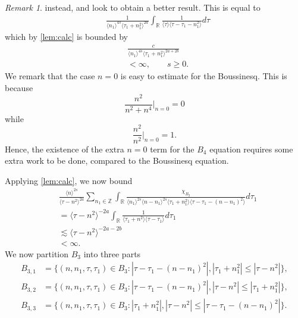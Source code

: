 \documentclass[12pt,reqno]{amsart}
\numberwithin{equation}{section}  %
\numberwithin{figure}{section}
\newcommand{\rr}{\mathbb{R}}
\newcommand{\zz}{\mathbb{Z}}
\theoremstyle{plain}
\theoremstyle{definition}
\theoremstyle{remark}
\newtheorem{remark}{Remark}
\begin{document}
\begin{framed}
\begin{remark}
instead, and look to obtain a better result. This is equal to 
%
\begin{equation*}
\begin{split}
  & \frac{1}{\langle n_{1} \rangle ^{4s}
  \langle \tau_{1} + n_{1}^{2} \rangle
  ^{2a}} \int_{\rr} \frac{1}{\langle
  \tau  \rangle  \langle \tau - \tau_{1} - n_{1}^{2}
  \rangle } d \tau
\end{split}
\end{equation*}
%
%
which by \autoref{lem:calc} is bounded by
%
%
\begin{equation*}
\begin{split}
  & \frac{c}{\langle n_{1} \rangle ^{4s}
  \langle \tau_{1} + n_{1}^{2} \rangle
  ^{2a + 2b}}
\\
& < \infty, \qquad s \ge 0. 
\end{split}
\end{equation*}
%
%
We remark that the case $n=0$ is easy to estimate for the Boussinesq. This is
because  $$\frac{n^{2}}{n^{2} + n^{4}} |_{n=0} = 0$$ while
$$\frac{n^{2}}{n^{2}} |_{n=0} = 1.$$ 
Hence, the existence of the extra $n = 0$ term 
for the $B_{4}$ equation requires some extra work to be done, compared to the
Boussinesq equation. 
\end{remark}
\end{framed}
Applying \autoref{lem:calc}, we now bound 
\begin{equation*}
  \begin{split}
    & \frac{ \langle n
    \rangle ^{2s}}{\langle \tau - n^{2} \rangle ^{2a}}
    \sum_{n_{1} \in \zz} \int_{\rr} \frac{\chi_{B_{2}}}{ \langle n_{1} \rangle ^{2s} \langle n-n_{1} \rangle ^{2s} 
    \langle \tau_{1} + n_{1}^{2} \rangle \langle  \tau - \tau_{1} -
    (n - n_{1})^{2} \rangle }
    d \tau_1 
    \\
    & = 
   \langle \tau -n^{2} \rangle ^{-2a}\int_{\rr} \frac{1}{\langle \tau_{1} +
  n^{2} \rangle \langle
  \tau - \tau_{1}\rangle }d \tau_{1}
  \\
  & \lesssim 
  \langle \tau - n^{2} \rangle ^{-2a-2b} 
  \\
  & < \infty.
\end{split}
\end{equation*}
%
%
We now 
partition $ B_{3}$ into three parts
\begin{align*}
B_{3,1}&=\{(n, n_1, \tau, \tau_1)\in B_3:
|\tau-\tau_1-(n-n_1)^2|, |\tau_1+n_1^2| \le |\tau-n^2|\},\\
B_{3,2}&=\{(n, n_1, \tau, \tau_1)\in B_3:
|\tau-\tau_1-(n-n_1)^2|, |\tau-n^2| \le |\tau_1+n_1^2|\},\\
B_{3,3}&=\{(n, n_1, \tau, \tau_1)\in B_3: |\tau_{1}+n_{1}^2|, | \tau - n^{2} | \le |  \tau - \tau_{1} -
(n - n_{1})^{2} |\}.
\end{align*} 
\end{document}
